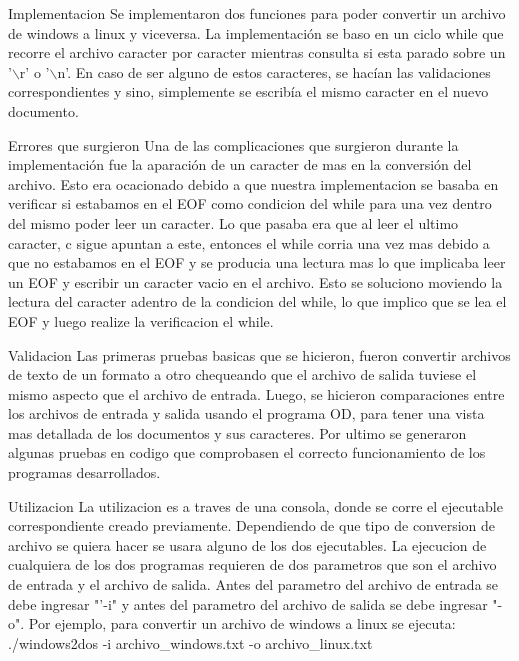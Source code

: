 \documentclass[11pt]{article}
\begin{document}
Implementacion
Se implementaron dos funciones para poder convertir un archivo de windows a linux y viceversa. La implementaci\'on se baso en un ciclo while que recorre el archivo caracter por caracter mientras consulta si esta parado sobre un '$\backslash$r' o '$\backslash$n'. En caso de ser alguno de estos caracteres, se hac\'ian las validaciones correspondientes y sino, simplemente se escribía el mismo caracter en el  nuevo documento.

Errores que surgieron 
Una de las complicaciones que surgieron durante la implementaci\'on fue la aparaci\'on de un caracter de mas en la conversi\'on del archivo. Esto era ocacionado debido a que nuestra implementacion se basaba en verificar si estabamos en el EOF como condicion del while para una vez dentro del mismo poder leer un caracter. Lo que pasaba era que al leer el ultimo caracter, c sigue apuntan a este, entonces el while corria una vez mas debido a que no estabamos en el EOF y se producia una lectura mas lo que implicaba leer un EOF y escribir un caracter vacio en el archivo. Esto se soluciono moviendo la lectura del caracter adentro de la condicion del while, lo que implico que se lea el EOF y luego realize la verificacion el while.


Validacion
Las primeras pruebas basicas que se hicieron, fueron convertir archivos de texto de un formato a otro chequeando que el archivo de salida tuviese el mismo aspecto que el archivo de entrada. Luego, se hicieron comparaciones entre los archivos de entrada y salida usando el programa OD, para tener una vista mas detallada de los documentos y sus caracteres. Por ultimo se generaron algunas pruebas en codigo que comprobasen el correcto funcionamiento de los programas desarrollados.

Utilizacion
La utilizacion es a traves de una consola, donde se corre el ejecutable correspondiente creado previamente. Dependiendo de que tipo de conversion de archivo se quiera hacer se usara alguno de los dos ejecutables. La ejecucion de cualquiera de los dos programas requieren de dos parametros que son el archivo de entrada y el archivo de salida. Antes del parametro del archivo de entrada se debe ingresar "'-i" y antes del parametro del archivo de salida se debe ingresar "-o". Por ejemplo, para convertir un archivo de windows a linux se ejecuta: ./windows2dos -i archivo_windows.txt -o archivo_linux.txt
\end{document}
